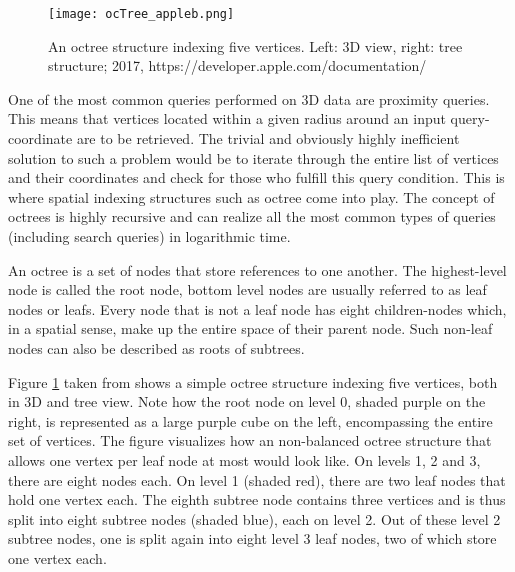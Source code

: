 \begin{figure}[htb]
  \centering
  \texttt{[image: ocTree\_appleb.png]}\\ %
  \caption{An octree structure indexing five vertices. Left: 3D view, right: tree structure; 2017, https://developer.apple.com/documentation/}\label{fig:ocTree_apple}
\end{figure}

One of the most common queries performed on 3D data are proximity queries. This means that vertices located within a given radius around an input query-coordinate are to be retrieved. The trivial and obviously highly inefficient solution to such a problem would be to iterate through the entire list of vertices and their coordinates and check for those who fulfill this query condition. This is where spatial indexing structures such as octree come into play. The concept of octrees is highly recursive and can realize all the most common types of queries (including search queries) in logarithmic time.

An octree is a set of nodes that store references to one another. The highest-level node is called the root node, bottom level nodes are usually referred to as leaf nodes or leafs. Every node that is not a leaf node has eight children-nodes which, in a spatial sense, make up the entire space of their parent node. Such non-leaf nodes can also be described as roots of subtrees.

Figure \ref{fig:ocTree_apple} taken from \cite{octAp} shows a simple octree structure indexing five vertices, both in 3D and tree view. Note how the root node on level 0, shaded purple on the right, is represented as a large purple cube on the left, encompassing the entire set of vertices. The figure visualizes how an non-balanced octree structure that allows one vertex per leaf node at most would look like. On levels 1, 2 and 3, there are eight nodes each. On level 1 (shaded red), there are two leaf nodes that hold one vertex each. The eighth subtree node contains three vertices and is thus split into eight subtree nodes (shaded blue), each on level 2. Out of these level 2 subtree nodes, one is split again into eight level 3 leaf nodes, two of which store one vertex each.

